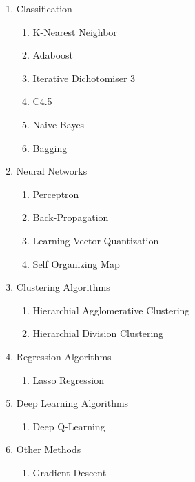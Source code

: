 \documentclass[a4paper]{article}
\begin{document}
\begin{enumerate}
\item Classification 
	\begin{enumerate}
	\item  K-Nearest Neighbor 
	\item Adaboost 
	\item Iterative Dichotomiser 3
	\item C4.5
	\item Naive Bayes
	\item  Bagging
	\end{enumerate}
 

	
	
\item Neural Networks
\begin{enumerate}
	\item Perceptron
	\item Back-Propagation
	\item Learning Vector Quantization
	\item Self Organizing Map
	
	
\end{enumerate}	

\item Clustering Algorithms
\begin{enumerate}
   \item Hierarchial Agglomerative Clustering
    \item Hierarchial Division Clustering
\end{enumerate}

\item Regression Algorithms
\begin{enumerate}
   \item Lasso Regression
\end{enumerate}

\item Deep Learning Algorithms
\begin{enumerate}
   \item Deep Q-Learning 
\end{enumerate}


\item Other Methods
\begin{enumerate}
   \item Gradient Descent
\end{enumerate}

\end{enumerate}
\end{document}
